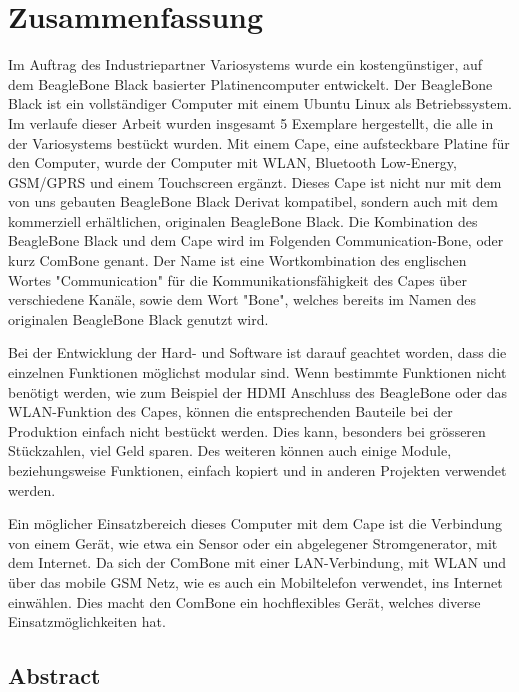 
\chapter*{Zusammenfassung}
Im Auftrag des Industriepartner Variosystems wurde ein kostengünstiger, auf dem BeagleBone Black basierter  Platinencomputer entwickelt. Der BeagleBone Black ist ein vollständiger Computer mit einem Ubuntu Linux als Betriebssystem. Im verlaufe dieser Arbeit wurden insgesamt 5 Exemplare hergestellt, die alle in der Variosystems bestückt wurden. Mit einem Cape, eine aufsteckbare Platine für den Computer, wurde der Computer mit WLAN, Bluetooth Low-Energy, GSM/GPRS und einem Touchscreen ergänzt. Dieses Cape ist nicht nur mit dem von uns gebauten BeagleBone Black Derivat kompatibel, sondern auch mit dem kommerziell erhältlichen, originalen BeagleBone Black. Die Kombination des BeagleBone Black und dem Cape wird im Folgenden Communication-Bone, oder kurz ComBone genant. Der Name ist eine Wortkombination des englischen Wortes "Communication" für die Kommunikationsfähigkeit des Capes über verschiedene Kanäle, sowie dem Wort "Bone", welches bereits im Namen des originalen BeagleBone Black genutzt wird.

%
%

Bei der Entwicklung der Hard- und Software ist darauf geachtet worden, dass die einzelnen Funktionen möglichst modular sind. Wenn bestimmte Funktionen nicht benötigt werden, wie zum Beispiel der HDMI Anschluss des BeagleBone oder das WLAN-Funktion des Capes, können die entsprechenden Bauteile bei der Produktion einfach nicht bestückt werden. Dies kann, besonders bei grösseren Stückzahlen, viel Geld sparen. Des weiteren können auch einige Module, beziehungsweise Funktionen, einfach kopiert und in anderen Projekten verwendet werden.

Ein möglicher Einsatzbereich dieses Computer mit dem Cape ist die Verbindung von einem Gerät, wie etwa ein Sensor oder ein abgelegener Stromgenerator, mit dem Internet. Da sich der ComBone mit einer LAN-Verbindung, mit WLAN und über das mobile GSM Netz, wie es auch ein Mobiltelefon verwendet, ins Internet einwählen. Dies macht den ComBone ein hochflexibles Gerät, welches diverse Einsatzmöglichkeiten hat.





\section*{Abstract}
